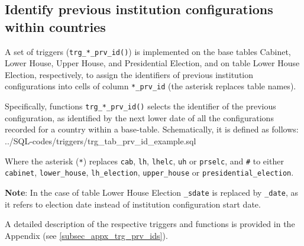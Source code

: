 \subsection{Identify previous institution configurations within countries}\label{subsec_trg_prv_ids}

A set of triggers (\texttt{trg\_*\_prv\_id()}) is implemented on the base tables Cabinet, Lower House, Upper House, and Presidential Election, and on table Lower House Election, respectively, to assign the identifiers of previous institution configurations into cells of column \texttt{*\_prv\_id} (the asterisk replaces table names).

Specifically, functions \texttt{trg\_*\_prv\_id()} selects the identifier of the previous configuration, as identified by the next lower date of all the configurations recorded for a country within a base-table.
Schematically, it is defined as follows:
%
{../SQL-codes/triggers/trg_tab_prv_id_example.sql}

Where the asterisk (\texttt{*}) replaces \texttt{cab}, \texttt{lh}, \texttt{lhelc}, \texttt{uh} or \texttt{prselc}, and \texttt{\#} to either \texttt{cabinet}, \texttt{lower\_house}, \texttt{lh\_election}, \texttt{upper\_house} or \texttt{presidential\_election}.

{\bf Note}: In the case of table Lower House Election \texttt{\_sdate} is replaced by \texttt{\_date}, as it refers to election date instead of institution configuration start date.

A detailed description of the respective triggers and functions is provided in the Appendix (see \ref{subsec_appx_trg_prv_ids}).




